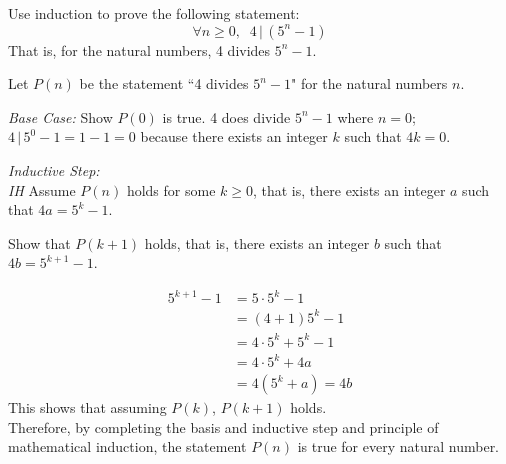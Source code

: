 \documentclass[11pt,addpoints]{exam}
\begin{document}
\begin{questions}
\begin{solution}
\end{solution}


\question[10] Use induction to prove the following statement:
	\[\forall n \geq 0, \;\; 4 \,|\, (5^{n} - 1)\]
That is, for the natural numbers, 4 divides $5^n - 1$.
    \ifprintanswers
        \vspace{-10pt}
   \fi
\begin{solution}
Let $P(n)$ be the statement ``4 divides $5^n - 1$" for the natural numbers $n$. 

\textit{Base Case:} Show $P(0)$ is true. 
	4 does divide $5^n - 1$ where $n=0$;  $4 \,|\, 5^0 - 1 = 1 - 1 = 0$ because there exists an integer $k$ such that $4k = 0$.

\textit{Inductive Step:} \\
\textit{IH} Assume $P(n)$ holds for some $k \geq 0$, that is, there exists an integer $a$ such that $4a = 5^k - 1$. 

Show that $P(k+1)$ holds, that is, there exists an integer $b$ such that $4b = 5^{k+1} - 1$. 

\begin{align*}
	5^{k+1} - 1 &= 5\cdot 5^{k} - 1 \\
	 &= (4 + 1)5^{k} - 1 \\
	 &= 4\cdot 5^{k} + 5^{k} - 1 \\
	 &= 4\cdot 5^{k} + 4a \tag{Ind. Hyp.} \\
	 &= 4(5^{k} + a)
	 = 4b
\end{align*}
This shows that assuming $P(k)$, $P(k+1)$ holds. \\
Therefore, by completing the basis and inductive step and principle of mathematical induction, the statement $P(n)$ is true for every natural number.
\end{solution}

\end{questions}
\end{document}
